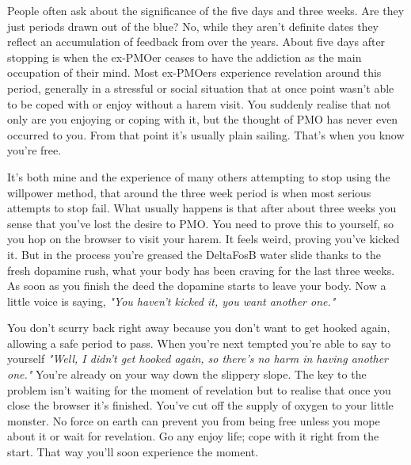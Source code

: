 \documentclass[easypeasy.tex]{subfiles}
\begin{document}
People often ask about the significance of the five days and three weeks. Are they just periods drawn out of the blue? No, while they aren't definite dates they reflect an accumulation of feedback from over the years. About five days after stopping is when the ex-PMOer ceases to have the addiction as the main occupation of their mind. Most ex-PMOers experience revelation around this period, generally in a stressful or social situation that at once point wasn't able to be coped with or enjoy without a harem visit. You suddenly realise that not only are you enjoying or coping with it, but the thought of PMO has never even occurred to you. From that point it's usually plain sailing. That's when you know you're free.

It's both mine and the experience of many others attempting to stop using the willpower method, that around the three week period is when most serious attempts to stop fail. What usually happens is that after about three weeks you sense that you've lost the desire to PMO. You need to prove this to yourself, so you hop on the browser to visit your harem. It feels weird, proving you've kicked it. But in the process you're greased the DeltaFosB water slide thanks to the fresh dopamine rush, what your body has been craving for the last three weeks. As soon as you finish the deed the dopamine starts to leave your body. Now a little voice is saying, \textit{"You haven't kicked it, you want another one."}

You don't scurry back right away because you don't want to get hooked again, allowing a safe period to pass. When you're next tempted you're able to say to yourself \textit{"Well, I didn't get hooked again, so there's no harm in having another one."} You're already on your way down the slippery slope. The key to the problem isn't waiting for the moment of revelation but to realise that once you close the browser it's finished. You've cut off the supply of oxygen to your little monster. No force on earth can prevent you from being free unless you mope about it or wait for revelation. Go any enjoy life; cope with it right from the start. That way you'll soon experience the moment.
\end{document}
